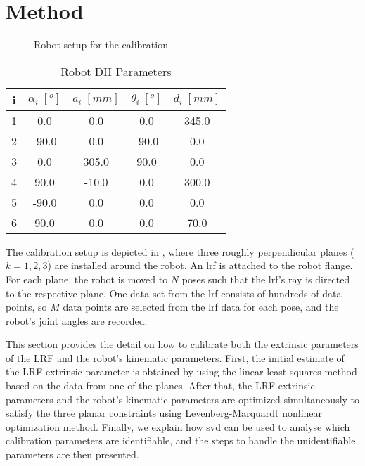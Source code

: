 \section{Method}
\label{sec:method}
\begin{figure}[t]
  \centering
  \vspace*{2mm}
  \caption{Robot setup for the calibration}
  \label{fig:robot_setup}
\end{figure}


\renewcommand{\arraystretch}{1.5}
\begin{table}[htp]
\caption{Robot DH Parameters}
\label{tab:dh_params}
\centering
\begin{tabular}{c c c c c}
\toprule
i &  \textbf{$\alpha_i \;[^o]$} & \textbf{$a_i \;[mm]$} &  \textbf{$\theta_i \;[^o]$}  & \textbf{$d_i \;[mm]$}\\
\midrule
1 & 0.0 & 0.0 & 0.0 & 345.0\\
2 & -90.0 & 0.0 & -90.0 & 0.0\\
3 & 0.0 & 305.0 & 90.0 & 0.0\\
4 & 90.0 & -10.0 & 0.0 & 300.0\\
5 & -90.0 & 0.0 & 0.0 & 0.0\\
6 & 90.0 & 0.0 & 0.0 & 70.0\\
\bottomrule
\end{tabular}
\end{table}

The calibration setup is depicted in , where three roughly perpendicular planes ($k=1,2,3$) are installed around the robot. An \ac{lrf} is attached to the robot flange. For each plane, the robot is moved to $N$ poses such that the \ac{lrf}'s ray is directed to the respective plane. One data set from the \ac{lrf} consists of hundreds of data points, so $M$ data points are selected from the \ac{lrf} data for each pose, and the robot's joint angles are recorded. 

This section provides the detail on how to calibrate both the extrinsic parameters of the LRF and the robot's kinematic parameters. First, the initial estimate of the LRF extrinsic parameter is obtained by using the linear least squares method based on the data from one of the planes. After that, the LRF extrinsic parameters and the robot's kinematic parameters are optimized simultaneously to satisfy the three planar constraints using Levenberg-Marquardt nonlinear optimization method. Finally, we explain how \ac{svd} can be used to analyse which calibration parameters are identifiable, and the steps to handle the unidentifiable parameters are then presented. 

